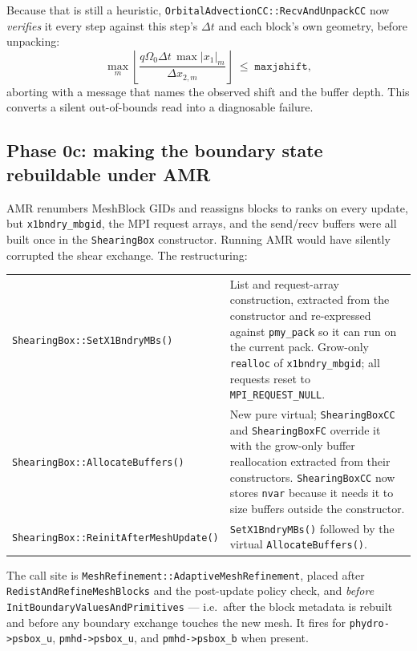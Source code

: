 \documentclass[11pt]{article}
\newcommand{\code}[1]{\texttt{#1}}
\newcommand{\fn}[1]{\texttt{\small #1}}
\newcommand{\Om}{\Omega_0}
\newcommand{\qom}{q\Om}
\begin{document}
Because that is still a heuristic, \fn{OrbitalAdvectionCC::RecvAndUnpackCC} now
\emph{verifies} it every step against this step's $\Delta t$ and each block's own
geometry, before unpacking:
\begin{equation}
  \max_m \left\lfloor \frac{\qom \Delta t\, \max|x_1|_m}{\Delta x_{2,m}} \right\rfloor
  \;\le\; \code{maxjshift},
\end{equation}
aborting with a message that names the observed shift and the buffer depth. This
converts a silent out-of-bounds read into a diagnosable failure.

\subsection{Phase 0c: making the boundary state rebuildable under AMR}
\label{sec:amrreinit}

AMR renumbers MeshBlock GIDs and reassigns blocks to ranks on every update, but
\code{x1bndry\_mbgid}, the MPI request arrays, and the send/recv buffers were all built
once in the \code{ShearingBox} constructor. Running AMR would have silently corrupted
the shear exchange. The restructuring:

\begin{center}
\small
\begin{tabular}{@{}lp{9.3cm}@{}}
\toprule
\fn{ShearingBox::SetX1BndryMBs()} & List and request-array construction, extracted
from the constructor and re-expressed against \code{pmy\_pack} so it can run on the
current pack. Grow-only \code{realloc} of \code{x1bndry\_mbgid}; all requests reset to
\code{MPI\_REQUEST\_NULL}. \\
\fn{ShearingBox::AllocateBuffers()} & New pure virtual; \code{ShearingBoxCC} and
\code{ShearingBoxFC} override it with the grow-only buffer reallocation extracted from
their constructors. \code{ShearingBoxCC} now stores \code{nvar} because it needs it to
size buffers outside the constructor. \\
\fn{ShearingBox::ReinitAfterMeshUpdate()} & \fn{SetX1BndryMBs()} followed by the
virtual \fn{AllocateBuffers()}. \\
\bottomrule
\end{tabular}
\end{center}

\noindent
The call site is \fn{MeshRefinement::AdaptiveMeshRefinement}, placed after
\fn{RedistAndRefineMeshBlocks} and the post-update policy check, and \emph{before}
\fn{InitBoundaryValuesAndPrimitives} --- i.e.\ after the block metadata is rebuilt and
before any boundary exchange touches the new mesh. It fires for
\code{phydro->psbox\_u}, \code{pmhd->psbox\_u}, and \code{pmhd->psbox\_b} when present.
\end{document}
